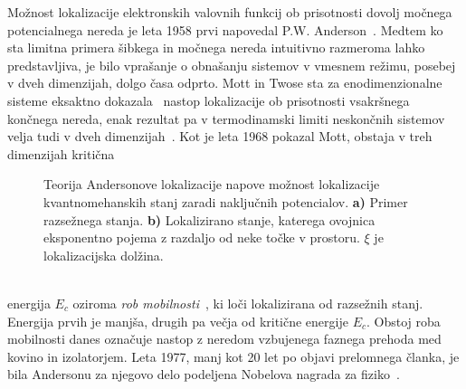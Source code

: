 \begin{minipage}[t]{0.54\textwidth}
\noindent 
 Možnost lokalizacije elektronskih valovnih funkcij ob prisotnosti dovolj močnega potencialnega nereda je leta 1958 prvi napovedal P.W. Anderson~\cite{anderson1958absence}. Medtem ko sta limitna primera šibkega in močnega nereda intuitivno razmeroma lahko predstavljiva, je bilo vprašanje o obnašanju sistemov v vmesnem režimu, posebej v dveh dimenzijah, dolgo časa odprto. Mott in Twose sta za enodimenzionalne sisteme eksaktno dokazala~\cite{doi:10.1080/00018736100101271} nastop lokalizacije ob prisotnosti vsakršnega končnega nereda, enak rezultat pa  v termodinamski limiti neskončnih sistemov velja tudi v dveh dimenzijah~\cite{abrahams1979scaling}. Kot je leta 1968 pokazal Mott, obstaja v treh dimenzijah kritična 
\end{minipage}\hfill
\begin{minipage}[t]{0.42\textwidth}
\begin{figure}[H]
\caption{Teorija Andersonove lokalizacije napove možnost lokalizacije kvantnomehanskih stanj zaradi naključnih potencialov. \textbf{a)} Primer razsežnega stanja. \textbf{b)} Lokalizirano stanje, katerega ovojnica eksponentno pojema z razdaljo od neke točke v prostoru. $\xi$ je lokalizacijska dolžina. 
}
\label{fig:dif_loc_ext}
\end{figure}
\end{minipage}\\
   energija $E_c$ oziroma \emph{rob mobilnosti}~\cite{mott1990metal}, ki loči lokalizirana od razsežnih stanj. Energija prvih je manjša, drugih pa večja od kritične energije $E_c$. Obstoj roba mobilnosti danes označuje nastop z neredom vzbujenega faznega prehoda med kovino in izolatorjem. Leta 1977, manj kot 20 let po objavi prelomnega članka, je bila Andersonu za njegovo delo podeljena Nobelova nagrada za fiziko~\cite{anderson1978local}.
